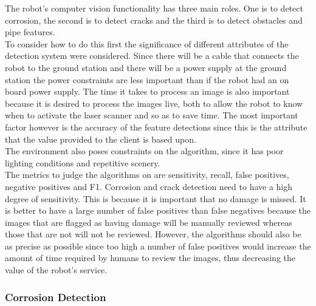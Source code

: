 \documentclass[11pt]{article}		%
\begin{document}
		The robot’s computer vision functionality has three main roles. 
		One is to detect corrosion, the second is to detect cracks and the third is to detect obstacles and pipe features.
		\\
        To consider how to do this first the significance of different attributes of the detection system were considered. 
        Since there will be a cable that connects the robot to the ground station and there will be a power supply at the ground station the power constraints are less important than if the robot had an on board power supply. 
        The time it takes to process an image is also important because it is desired to process the images live, both to allow the robot to know when to activate the laser scanner and so as to save time. 
        The most important factor however is the accuracy of the feature detections since this is the attribute that the value provided to the client is based upon.
        \\
        The environment also poses constraints on the algorithm, since it has poor lighting conditions and repetitive scenery.
        \\
        The metrics to judge the algorithms on are sensitivity, recall, false positives, negative positives and F1. %
        Corrosion and crack detection need to have a high degree of sensitivity. 
        This is because it is important that no damage is missed. 
        It is better to have a large number of false positives than false negatives because the images that are flagged as having damage will be manually reviewed whereas those that are not will not be reviewed. 
        However, the algorithms should also be as precise as possible since too high a number of false positives would increase the amount of time required by humans to review the images, thus decreasing the value of the robot’s service.
        
        \subsubsection{Corrosion Detection}
\end{document}
